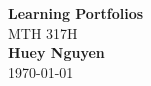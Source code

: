 \begin{titlepage}
    \begin{center}
    {\fontsize{40}{48}\selectfont \bfseries Learning Portfolios} 
    \\\vspace{20pt}
    {\LARGE MTH 317H} \\
    \vspace{20pt}
    \textbf{Huey Nguyen}
    \vspace{8pt}
    \\\today
    \end{center}
\end{titlepage}
